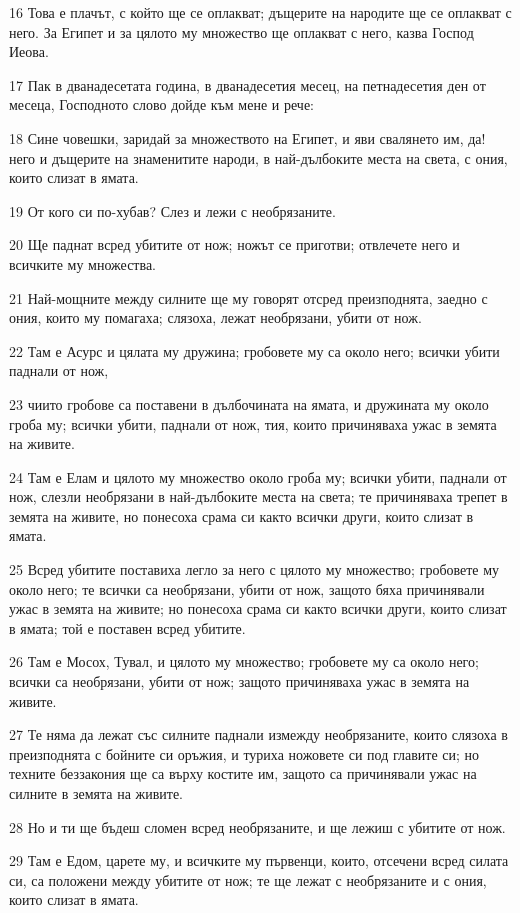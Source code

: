 \par 16 Това е плачът, с който ще се оплакват; дъщерите на народите ще се оплакват с него. За Египет и за цялото му множество ще оплакват с него, казва Господ Иеова.
\par 17 Пак в дванадесетата година, в дванадесетия месец, на петнадесетия ден от месеца, Господното слово дойде към мене и рече:
\par 18 Сине човешки, заридай за множеството на Египет, и яви свалянето им, да! него и дъщерите на знаменитите народи, в най-дълбоките места на света, с ония, които слизат в ямата.
\par 19 От кого си по-хубав? Слез и лежи с необрязаните.
\par 20 Ще паднат всред убитите от нож; ножът се приготви; отвлечете него и всичките му множества.
\par 21 Най-мощните между силните ще му говорят отсред преизподнята, заедно с ония, които му помагаха; слязоха, лежат необрязани, убити от нож.
\par 22 Там е Асурс и цялата му дружина; гробовете му са около него; всички убити паднали от нож,
\par 23 чиито гробове са поставени в дълбочината на ямата, и дружината му около гроба му; всички убити, паднали от нож, тия, които причиняваха ужас в земята на живите.
\par 24 Там е Елам и цялото му множество около гроба му; всички убити, паднали от нож, слезли необрязани в най-дълбоките места на света; те причиняваха трепет в земята на живите, но понесоха срама си както всички други, които слизат в ямата.
\par 25 Всред убитите поставиха легло за него с цялото му множество; гробовете му около него; те всички са необрязани, убити от нож, защото бяха причинявали ужас в земята на живите; но понесоха срама си както всички други, които слизат в ямата; той е поставен всред убитите.
\par 26 Там е Мосох, Тувал, и цялото му множество; гробовете му са около него; всички са необрязани, убити от нож; защото причиняваха ужас в земята на живите.
\par 27 Те няма да лежат със силните паднали измежду необрязаните, които слязоха в преизподнята с бойните си оръжия, и туриха ножовете си под главите си; но техните беззакония ще са върху костите им, защото са причинявали ужас на силните в земята на живите.
\par 28 Но и ти ще бъдеш сломен всред необрязаните, и ще лежиш с убитите от нож.
\par 29 Там е Едом, царете му, и всичките му първенци, които, отсечени всред силата си, са положени между убитите от нож; те ще лежат с необрязаните и с ония, които слизат в ямата.
